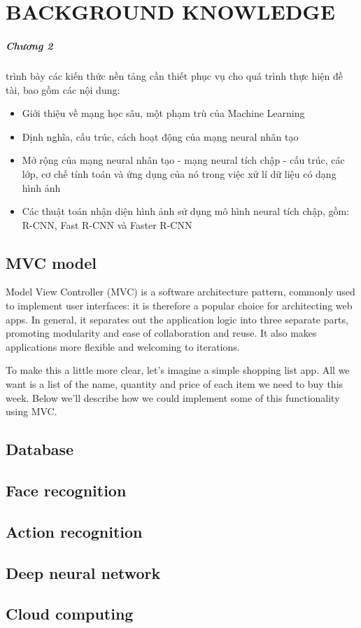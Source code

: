 \chapter{BACKGROUND KNOWLEDGE}
\label{chap:background}
\paragraph{Chương 2} trình bày các kiến thức nền tảng cần thiết phục vụ cho quá trình thực hiện đề tài, bao gồm các nội dung:

\begin{itemize}
\item Giới thiệu về mạng học sâu, một phạm trù của Machine Learning

\item Định nghĩa, cấu trúc, cách hoạt động của mạng neural nhân tạo

\item Mở rộng của mạng neural nhân tạo - mạng neural tích chập - cấu trúc, các lớp, cơ chế tính toán và ứng dụng của nó trong việc xử lí dữ liệu có dạng hình ảnh

\item Các thuật toán nhận diện hình ảnh sử dụng mô hình neural tích chập, gồm: R-CNN, Fast R-CNN và Faster R-CNN
\end{itemize}

\section{MVC model}
Model View Controller (MVC) is a software architecture pattern, commonly used to implement user interfaces: it is therefore a popular choice for architecting web apps. In general, it separates out the application logic into three separate parts, promoting modularity and ease of collaboration and reuse. It also makes applications more flexible and welcoming to iterations.

To make this a little more clear, let's imagine a simple shopping list app. All we want is a list of the name, quantity and price of each item we need to buy this week. Below we'll describe how we could implement some of this functionality using MVC.

\section{Database}
\section{Face recognition}
\section{Action recognition}
\section{Deep neural network}
\section{Cloud computing}
